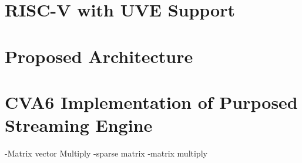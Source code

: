 \section{RISC-V with UVE Support}
\section{Proposed Architecture}
\section{CVA6 Implementation of Purposed Streaming Engine }

-Matrix vector Multiply
-sparse matrix
-matrix multiply